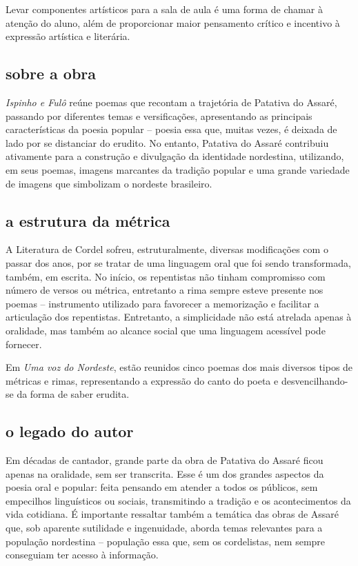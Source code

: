 \documentclass[12pt]{extarticle}
\begin{document}
Levar componentes artísticos para a sala de aula é uma forma de chamar à
atenção do aluno, além de proporcionar maior pensamento crítico e
incentivo à expressão artística e literária.


\subsection{sobre a obra }

\emph{Ispinho e Fulô} reúne poemas que recontam a trajetória de Patativa
do Assaré, passando por diferentes temas e versificações, apresentando
as principais características da poesia popular -- poesia essa que,
muitas vezes, é deixada de lado por se distanciar do erudito. No
entanto, Patativa do Assaré contribuiu ativamente para a construção e
divulgação da identidade nordestina, utilizando, em seus poemas, imagens
marcantes da tradição popular e uma grande variedade de imagens que
simbolizam o nordeste brasileiro.

\subsection{a estrutura da métrica}

A Literatura de Cordel sofreu, estruturalmente, diversas modificações
com o passar dos anos, por se tratar de uma linguagem oral que foi sendo
transformada, também, em escrita. No início, os repentistas não tinham
compromisso com número de versos ou métrica, entretanto a rima sempre
esteve presente nos poemas -- instrumento utilizado para favorecer a
memorização e facilitar a articulação dos repentistas. Entretanto, a
simplicidade não está atrelada apenas à oralidade, mas também ao alcance
social que uma linguagem acessível pode fornecer.

Em \emph{Uma voz do Nordeste}, estão reunidos cinco poemas dos mais
diversos tipos de métricas e rimas, representando a expressão do canto
do poeta e desvencilhando-se da forma de saber erudita.

\subsection{o legado do autor}

Em décadas de cantador, grande parte da obra de Patativa do Assaré ficou
apenas na oralidade, sem ser transcrita. Esse é um dos grandes aspectos
da poesia oral e popular: feita pensando em atender a todos os públicos,
sem empecilhos linguísticos ou sociais, transmitindo a tradição e os
acontecimentos da vida cotidiana. É importante ressaltar também a
temática das obras de Assaré que, sob aparente sutilidade e ingenuidade,
aborda temas relevantes para a população nordestina -- população essa
que, sem os cordelistas, nem sempre conseguiam ter acesso à informação.
\end{document}
